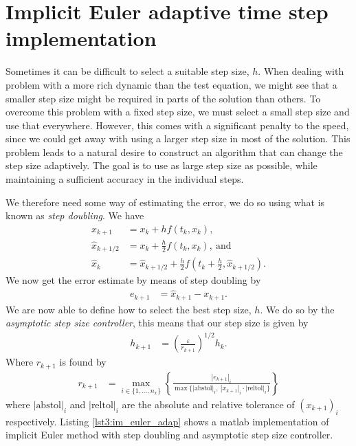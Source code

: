 \section{Implicit Euler adaptive time step implementation}
Sometimes it can be difficult to select a suitable step size, $h$. When dealing with problem with a more rich dynamic than the test equation, we might see that a smaller step size might be required in parts of the solution than others. To overcome this problem with a fixed step size, we must select a small step size and use that everywhere. However, this comes with a significant penalty to the speed, since we could get away with using a larger step size in most of the solution. This problem leads to a natural desire to construct an algorithm that can change the step size adaptively. The goal is to use as large step size as possible, while maintaining a sufficient accuracy in the individual steps. 

We therefore need some way of estimating the error, we do so using what is known as \textit{step doubling}. We have
\begin{align}
    x_{k+1} &= x_k + hf(t_k,x_k), \\
    \hat{x}_{k+1/2} &= x_k + \frac{h}{2}f(t_k,x_k), \ \text{and} \\
    \hat{x}_{k} &= \hat{x}_{k+1/2} + \frac{h}{2}f(t_k+\frac{h}{2},\hat{x}_{k+1/2}).
\end{align}
We now get the error estimate by means of step doubling by
\begin{align}
    e_{k+1} &= \hat{x}_{k+1} - x_{k+1}.
\end{align}
We are now able to define how to select the best step size, $h$. We do so by the \textit{asymptotic step size controller}, this means that our step size is given by
\begin{align}
    h_{k+1} &= \left(\frac{\varepsilon}{r_{k+1}} \right )^{1/2} h_k.
\end{align}
Where $r_{k+1}$ is found by
\begin{align}
    r_{k+1} &= \max_{i \in \{1,...,n_x\}} \left \{ \frac{|e_{k+1}|_i}{ \max \{ |\text{abstol}|_i, \ |x_{k+1}|_i \cdot |\text{reltol}|_i \} } \right \}
\end{align}
where $|\text{abstol}|_i$ and $|\text{reltol}|_i$ are the absolute and relative tolerance of $(x_{k+1})_i$ respectively. Listing \ref{lst3:im_euler_adap} shows a matlab implementation of implicit Euler method with step doubling and asymptotic step size controller. 

